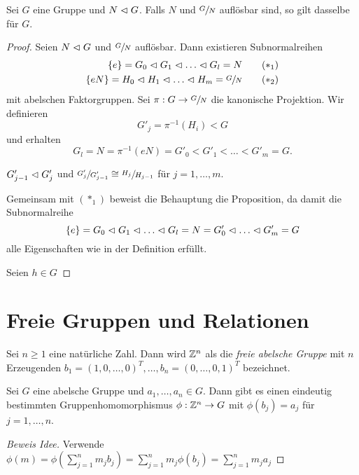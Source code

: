 \begin{proposition}
	Sei $G$ eine Gruppe und $N \vartriangleleft G$. Falls $N$ und $\sfrac{G}{N}$ auflösbar sind, so gilt dasselbe für $G$.
\end{proposition}

\begin{proof}
	Seien $N \vartriangleleft G$ und $\sfrac{G}{N}$ auflösbar. Dann existieren Subnormalreihen
	\begin{align*}
		\{e\} = G_0 \lTri G_1 \lTri \ldots \lTri G_{l} = N \tag{$*_{1}$}\\
		\{eN\} = H_0 \lTri H_1 \lTri \ldots \lTri H_{m} = \sfrac{G}{N} \tag{$*_{2}$}
	\end{align*}
	mit abelschen Faktorgruppen. Sei $\pi: G \to \sfrac{G}{N}$ die kanonische Projektion.
	Wir definieren
	\[
		G'_{j} = \pi^{-1}(H_{i}) < G
	\] 
	und erhalten
	\[
		G_{l} = N = \pi^{-1}(e N) = G'_{0} < G'_{1} < \ldots < G'_{m} = G
	.\] 
	\begin{claim}
		$G'_{j-1} \vartriangleleft G'_{j}$ und $\sfrac{G'_{j}}{G'_{j-1}} \cong \sfrac{H_j}{H_{j-1}}$ für $j = 1,\ldots,m$.
	\end{claim}
	Gemeinsam mit $(*_{1})$ beweist die Behauptung die Proposition, da damit die Subnormalreihe
	\[
		\{e\}  = G_{0} \vartriangleleft G_1 \vartriangleleft \ldots \vartriangleleft G_{l} = N = G'_{0} \vartriangleleft \ldots \vartriangleleft G'_{m} = G
	\] 
	alle Eigenschaften wie in der Definition erfüllt.

	Seien $h \in G_{}$
\end{proof}


\section{Freie Gruppen und Relationen}
\begin{definition}
	Sei $n \geq 1$ eine natürliche Zahl. Dann wird $\mathbb{Z}^{n}$ als die \emph{freie abelsche Gruppe} mit $n$ Erzeugenden  
	$b_1 = (1,0,\ldots,0)^{T}, \ldots , b_{n} = (0,\ldots,0,1)^{T}$ bezeichnet.
\end{definition}

\begin{lemma}
	Sei $G$ eine abelsche Gruppe und $a_1,\ldots,a_{n} \in G$. Dann gibt es einen eindeutig bestimmten 
	Gruppenhomomorphismus $\phi: \mathbb{Z}^{n} \to G$ mit $\phi(b_{j}) = a_{j}$ für $j = 1,\ldots,n$.
\end{lemma}

\begin{proof}[Beweis Idee]
	Verwende $\phi(m) = \phi(\sum_{j=1}^{n} m_{j} b_{j}) = \sum_{j=1}^{n} m_{j} \phi(b_{j}) =\sum_{j=1}^{n} m_{j} a_{j}$
\end{proof}

